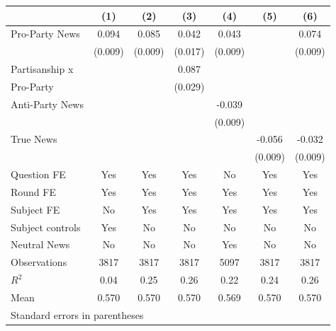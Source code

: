 \begin{tabular}{l*{6}{c}}
\hline\hline
                    &\multicolumn{1}{c}{(1)}&\multicolumn{1}{c}{(2)}&\multicolumn{1}{c}{(3)}&\multicolumn{1}{c}{(4)}&\multicolumn{1}{c}{(5)}&\multicolumn{1}{c}{(6)}\\
\hline
Pro-Party News      &    0.094&    0.085&    0.042&    0.043&         &    0.074\\
                    &  (0.009)&  (0.009)&  (0.017)&  (0.009)&         &  (0.009)\\
Partisanship x      &         &         &    0.087&         &         &         \\
Pro-Party           &         &         &  (0.029)&         &         &         \\
Anti-Party News     &         &         &         &   -0.039&         &         \\
                    &         &         &         &  (0.009)&         &         \\
True News           &         &         &         &         &   -0.056&   -0.032\\
                    &         &         &         &         &  (0.009)&  (0.009)\\
Question FE         &      Yes&      Yes&      Yes&       No&      Yes&      Yes\\
Round FE            &      Yes&      Yes&      Yes&      Yes&      Yes&      Yes\\
Subject FE          &       No&      Yes&      Yes&      Yes&      Yes&      Yes\\
Subject controls    &      Yes&       No&       No&       No&       No&       No\\
Neutral News        &       No&       No&       No&      Yes&       No&       No\\
\hline
Observations        &     3817&     3817&     3817&     5097&     3817&     3817\\
\(R^{2}\)           &     0.04&     0.25&     0.26&     0.22&     0.24&     0.26\\
Mean                &    0.570&    0.570&    0.570&    0.569&    0.570&    0.570\\
\hline\hline
\multicolumn{7}{l}{\footnotesize Standard errors in parentheses}\\
\end{tabular}
